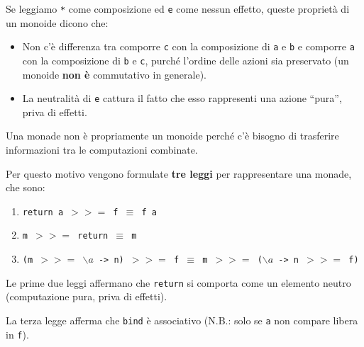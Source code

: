 \documentclass{article}
\begin{document}
Se leggiamo \texttt{*} come composizione ed \texttt{e} come nessun effetto, queste proprietà di un monoide dicono che:
\begin{itemize}
    \item Non c’è differenza tra comporre \texttt{c} con la composizione di \texttt{a} e \texttt{b} e comporre \texttt{a} con la composizione di \texttt{b} e \texttt{c}, purché l’ordine delle azioni sia preservato (un monoide \textbf{non è} commutativo in generale).
    \item La neutralità di \texttt{e} cattura il fatto che esso rappresenti una azione “pura”, priva di effetti.
\end{itemize}
\vspace{8pt}
Una monade non è propriamente un monoide perché c'è bisogno di trasferire informazioni tra le computazioni combinate.

Per questo motivo vengono formulate \textbf{tre leggi} per rappresentare una monade, che sono:
\begin{enumerate}
    \item \quad \texttt{return a $>>=$ f $\equiv$ f a}
    \item \quad \texttt{m $>>=$ return $\equiv$ m}
    \item \quad \texttt{(m $>>=$ $\backslash a$ -> n) $>>=$ f $\equiv$ m $>>=$ ($\backslash a$ -> n $>>=$ f)}
\end{enumerate}
Le prime due leggi affermano che \texttt{return} si comporta come un elemento neutro (computazione pura, priva di effetti).

La terza legge afferma che \texttt{bind} è associativo (N.B.: solo se \texttt{a} non compare libera in \texttt{f}).
\end{document}
